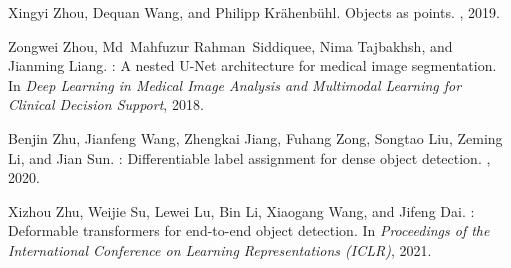 \documentclass[10pt,twocolumn,letterpaper]{article}
\begin{document}
{\begin{thebibliography}{100}
				Xingyi Zhou, Dequan Wang, and Philipp Kr{\"a}henb{\"u}hl.
				\newblock Objects as points.
				, 2019.
				
				Zongwei Zhou, Md~Mahfuzur Rahman~Siddiquee, Nima Tajbakhsh, and Jianming Liang.
				: A nested {U-Net} architecture for medical image
				segmentation.
				\newblock In {\em Deep Learning in Medical Image Analysis and Multimodal
					Learning for Clinical Decision Support}, 2018.
				
				Benjin Zhu, Jianfeng Wang, Zhengkai Jiang, Fuhang Zong, Songtao Liu, Zeming Li,
				and Jian Sun.
				: Differentiable label assignment for dense object
				detection.
				, 2020.
				
				Xizhou Zhu, Weijie Su, Lewei Lu, Bin Li, Xiaogang Wang, and Jifeng Dai.
				: Deformable transformers for end-to-end object
				detection.
				\newblock In {\em Proceedings of the International Conference on Learning
					Representations (ICLR)}, 2021.
				
			\end{thebibliography}
			
		}
		
		\newpage
		
		\appendix
		
		\setcounter{table}{0}
		\renewcommand{\thetable}{A\arabic{table}}
		
		\setcounter{figure}{0}
		\renewcommand{\thefigure}{A\arabic{figure}}
		
		\clearpage
		


		
		


		
		


		
		
\end{document}
